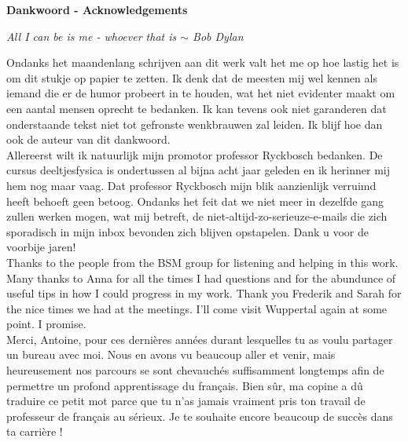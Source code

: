 \clearpage
\thispagestyle{empty}

\begin{huge}
\textbf{Dankwoord - Acknowledgements}\\
\end{huge}
\begin{flushright}
\textit{All I can be is me - whoever that is $\sim$ Bob Dylan
\\}
\end{flushright}

\noindent Ondanks het maandenlang schrijven aan dit werk valt het me op hoe lastig het is om dit stukje op papier te zetten. Ik denk dat de meesten mij wel kennen als iemand die er de humor probeert in te houden, wat het niet evidenter maakt om een aantal mensen oprecht te bedanken. Ik kan tevens ook niet garanderen dat onderstaande tekst niet tot gefronste wenkbrauwen zal leiden. Ik blijf hoe dan ook de auteur van dit dankwoord.\\

\noindent Allereerst wilt ik natuurlijk mijn promotor professor Ryckbosch bedanken. De cursus deeltjesfysica is ondertussen al bijna acht jaar geleden en ik herinner mij hem nog maar vaag. Dat professor Ryckbosch mijn blik aanzienlijk verruimd heeft behoeft geen betoog. Ondanks het feit dat we niet meer in dezelfde gang zullen werken mogen, wat mij betreft, de niet-altijd-zo-serieuze-e-mails die zich sporadisch in mijn inbox bevonden zich blijven opstapelen. Dank u voor de voorbije jaren!\\

\noindent Thanks to the people from the BSM group for listening and helping in this work. Many thanks to Anna for all the times I had questions and for the abundunce of useful tips in how I could progress in my work. Thank you Frederik and Sarah for the nice times we had at the meetings. I'll come visit Wuppertal again at some point. I promise.\\

\noindent Merci, Antoine, pour ces dernières années durant lesquelles tu as voulu partager un bureau avec moi. Nous en avons vu beaucoup aller et venir, mais heureusement nos parcours se sont chevauchés suffisamment longtemps afin de permettre un profond apprentissage du français. Bien sûr, ma copine a dû traduire ce petit mot parce que tu n'as jamais vraiment pris ton travail de professeur de français au sérieux. Je te souhaite encore beaucoup de succès dans ta carrière !\\

